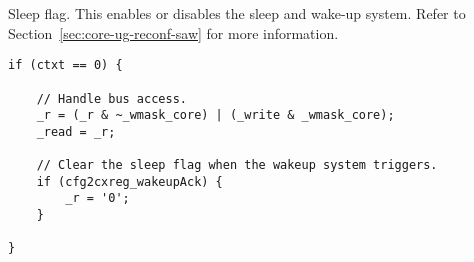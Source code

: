 Sleep flag. This enables or disables the sleep and wake-up system. Refer to
Section~\ref{sec:core-ug-reconf-saw} for more information.

\declaration{}
\implementation{}
\begin{lstlisting}
if (ctxt == 0) {

    // Handle bus access.
    _r = (_r & ~_wmask_core) | (_write & _wmask_core);
    _read = _r;

    // Clear the sleep flag when the wakeup system triggers.
    if (cfg2cxreg_wakeupAck) {
        _r = '0';
    }
    
}
\end{lstlisting}
